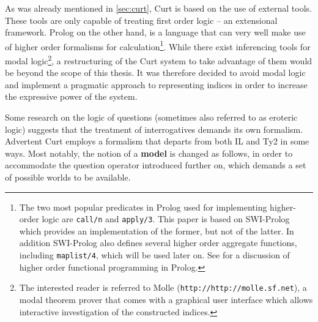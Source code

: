 \documentclass[a4paper]{article}
\newcommand{\abbr}{\textsf} %
\newcommand{\term}[1]{\textsf{\textbf{#1}}} %
\newcommand{\code}[1]{\texttt{#1}} %
\newcommand{\pn}{\textsf} %
\newcommand{\url}[1]{\code{http://#1}} %
\newcommand{\curt}{\pn{Curt}}
\newcommand{\acurt}{\pn{Advertent Curt}}
\newcommand{\prol}{\pn{Prolog}}
\theoremstyle{remark}
\theoremstyle{remark}
\theoremstyle{definition}
\theoremstyle{definition}
\begin{document}
As was already mentioned in \ref{sec:curt}, \curt{} is based on 
the use of external tools. These tools are only capable of treating first order logic – an
extensional framework. \prol{} on the other hand, is a language that can very well
make use of higher order formalisms for calculation\footnote{The two most
popular predicates in \prol{} used for implementing higher-order logic are
\code{call/n} and \code{apply/3}. This paper is based on \pn{SWI-Prolog} which
provides an implementation of the former, but not of the latter. In addition
\pn{SWI-Prolog} also defines several higher order aggregate functions, including
\code{maplist/4}, which will be used later on. See \cite{naish:prolhio} for a
discussion of higher order functional programming in \prol.}.  While there exist
inferencing tools for modal logic\footnote{ The interested reader is referred to
\pn{Molle} (\url{http://molle.sf.net}), a modal theorem prover that comes with a
graphical user interface which allows interactive investigation of the
constructed indices.}, a restructuring of the \curt{} system to take advantage
of them would be beyond the scope of this thesis.  It was therefore decided to
avoid modal logic and implement a pragmatic approach to representing indices in
order to increase the expressive power of the system.

Some research on the logic of questions (sometimes also referred to as eroteric
logic) suggests that the treatment of interrogatives demands its own formalism.
\acurt{} employs a formalism that departs from both \abbr{IL} and \abbr{Ty2} in
some ways. Most notably, the notion of a \term{model} is changed as follows, in
order to accommodate the question operator introduced further on, which demands
a set of possible worlds to be available.
\end{document}
